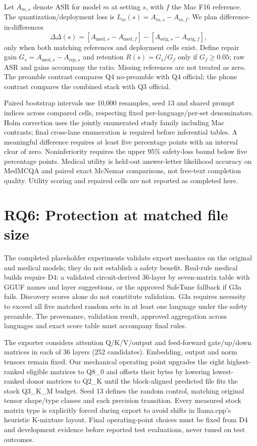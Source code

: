 \documentclass[11pt,a4paper]{article}
\begin{document}
Let $A_{m,s}$ denote ASR for model $m$ at setting $s$, with $f$ the Mac F16 reference. The quantization/deployment loss is $L_m(s)=A_{m,s}-A_{m,f}$. We plan difference-in-differences
\[
\Delta\Delta(s)=[A_{\mathrm{med},s}-A_{\mathrm{med},f}]-[A_{\mathrm{orig},s}-A_{\mathrm{orig},f}],
\]
only when both matching references and deployment cells exist. Define repair gain $G_s=A_{\mathrm{med},s}-A_{\mathrm{rep},s}$ and retention $R(s)=G_s/G_f$ only if $G_f\geq0.05$; raw ASR and gains accompany the ratio. Missing references are not treated as zero. The preamble contrast compares Q4 no-preamble with Q4 official; the phone contrast compares the combined stack with Q3 official.

Paired bootstrap intervals use 10,000 resamples, seed 13 and shared prompt indices across compared cells, respecting fixed per-language/per-set denominators. Holm correction uses the jointly enumerated study family including Mac contrasts; final cross-lane enumeration is required before inferential tables. A meaningful difference requires at least five percentage points with an interval clear of zero. Noninferiority requires the upper 95\% safety-loss bound below five percentage points. Medical utility is held-out answer-letter likelihood accuracy on MedMCQA and paired exact McNemar comparisons, not free-text completion quality. Utility scoring and repaired cells are not reported as completed here.

\section{RQ6: Protection at matched file size}

The completed placeholder experiments validate export mechanics on the original and medical models; they do not establish a safety benefit. Real-rule medical builds require D4: a validated circuit-derived 36-layer by seven-matrix table with GGUF names and layer suggestions, or the approved SafeTune fallback if G3a fails. Discovery scores alone do not constitute validation. G3a requires necessity to exceed all five matched random sets in at least one language under the safety preamble. The provenance, validation result, approved aggregation across languages and exact score table must accompany final rules.

The exporter considers attention Q/K/V/output and feed-forward gate/up/down matrices in each of 36 layers (252 candidates). Embedding, output and norm tensors remain fixed. Our mechanical operating point upgrades the eight highest-ranked eligible matrices to Q8\_0 and offsets their bytes by lowering lowest-ranked donor matrices to Q2\_K until the block-aligned predicted file fits the stock Q3\_K\_M budget. Seed 13 defines the random control, matching original tensor shape/type classes and each precision transition. Every measured stock matrix type is explicitly forced during export to avoid shifts in llama.cpp's heuristic K-mixture layout. Final operating-point choices must be fixed from D4 and development evidence before reported test evaluations, never tuned on test outcomes.
\end{document}
